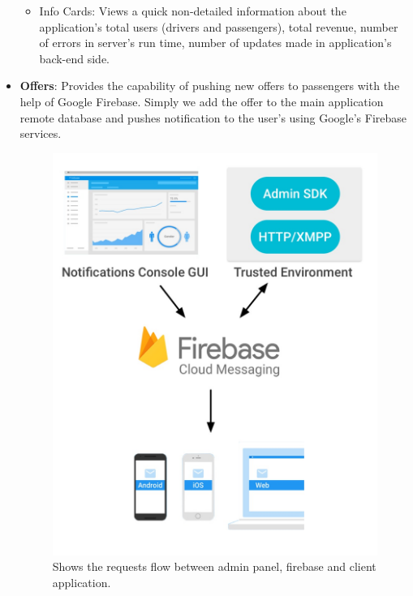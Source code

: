 \begin{itemize}
\begin{itemize}
	\item Info Cards: Views a quick non-detailed information about the application’s total users (drivers and passengers), total revenue, number of errors in server’s run time, number of updates made in application’s back-end side.
\end{itemize}
\item \textbf{Offers}: Provides the capability of pushing new offers to passengers with the help of Google Firebase. Simply we add the offer to the main application remote database and pushes notification to the user’s using Google’s Firebase services. 
\newline
\begin{figure}[htp]%
    \center%
    \includegraphics[width=1\textwidth]{images/ch5/fig1.jpg}%
    \caption[Shows the requests flow between admin panel, firebase and client application.]{Shows the requests flow between admin panel, firebase and client application.}\label{fig: fig1}%
  \end{figure}
  \newline


\end{itemize}
